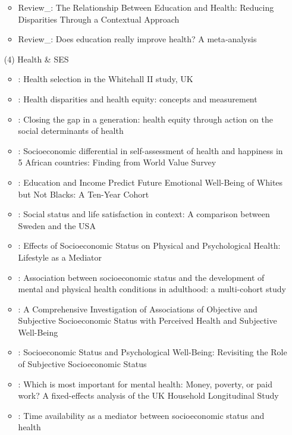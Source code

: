 \documentclass[12pt]{article}
\begin{document}
\begin{itemize}
\begin{itemize}
        \item Review\_\cite{zajacova2018relationship}: The Relationship Between Education and Health: Reducing Disparities Through a Contextual Approach
        \item Review\_\cite{xue2021does}: Does education really improve health? A meta‐analysis
    \end{itemize}
    \item[(4)] Health \& SES
    \begin{itemize}
        \item \cite{chandola2003health}: Health selection in the Whitehall II study, UK
        \item \cite{braveman2006health}: Health disparities and health equity: concepts and measurement
        \item \cite{marmot2008closing}: Closing the gap in a generation: health equity through action on the social determinants of health
        \item \cite{adesanya2017socioeconomic}: Socioeconomic differential in self-assessment of health and happiness in 5 African countries: Finding from World Value Survey
        \item \cite{assari2018education}: Education and Income Predict Future Emotional Well-Being of Whites but Not Blacks: A Ten-Year Cohort
        \item \cite{fors2018social}: Social status and life satisfaction in context: A comparison between Sweden and the USA
        \item \cite{wang2019effects}: Effects of Socioeconomic Status on Physical and Psychological Health: Lifestyle as a Mediator
        \item \cite{kivimaki2020association}: Association between socioeconomic status and the development of mental and physical health conditions in adulthood: a multi-cohort study
        \item \cite{kezer2020comprehensive}: A Comprehensive Investigation of Associations of Objective and Subjective Socioeconomic Status with Perceived Health and Subjective Well-Being
        \item \cite{navarro2020socioeconomic}: Socioeconomic Status and Psychological Well-Being: Revisiting the Role of Subjective Socioeconomic Status
        \item \cite{kromydas2021most}: Which is most important for mental health: Money, poverty, or paid work? A fixed-effects analysis of the UK Household Longitudinal Study
        \item \cite{bo2022time}: Time availability as a mediator between socioeconomic status and health 

\end{itemize}
\end{itemize}
\end{document}
